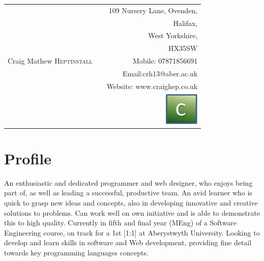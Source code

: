 \documentclass[a4paper,10pt]{article}
\begin{document}
\pagestyle{empty}

\begin{tabular}{l p{1.6cm} r}
 & &109 Nursery Lane, Ovenden,  \\
& &Halifax,   \\
& &West Yorkshire,  \\
& &HX35SW  \\
 \huge Craig Mathew \textsc{Heptinstall} &  &Mobile: 07871856691  \\
& & Email:crh13@aber.ac.uk\\
& & Website: www.craighep.co.uk \\[0.1cm]
&& \includegraphics[width=.8cm]{logo} 
\end{tabular}

%
\section{Profile}
An enthusiastic and dedicated programmer and web designer, who enjoys being part of, as well as leading a successful, productive team. An avid learner who is quick to grasp new ideas and concepts, also in developing innovative and creative solutions to problems. Can work well on own initiative and is able to demonstrate this to high quality. Currently in fifth and final year (MEng) of a Software Engineering course, on track for a 1st [1:1] at Aberystwyth University. Looking to develop and learn skills in software and Web development, providing fine detail towards key programming languages concepts.
\end{document}

